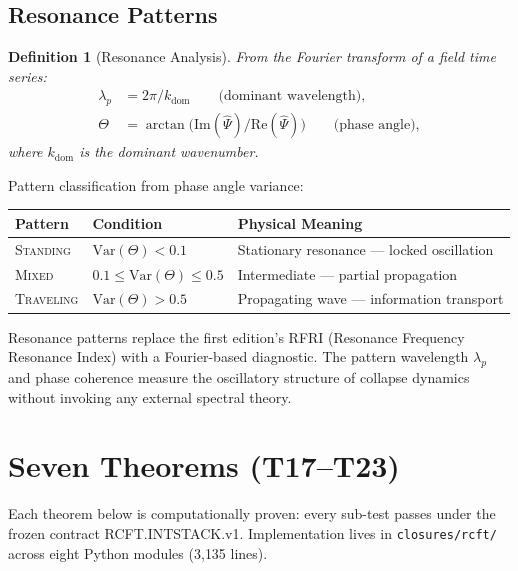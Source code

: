 \documentclass[
  aps,
  prd,
  preprint,
  superscriptaddress,
  nofootinbib,
  floatfix,
  longbibliography
]{revtex4-2}
\newtheorem{definition}[theorem]{Definition}
\newcommand{\regime}[1]{\textnormal{\textsc{#1}}}
\newcommand{\Psifield}{\Psi}
\begin{document}
\subsection{Resonance Patterns}

\begin{definition}[Resonance Analysis]\label{def:resonance}
From the Fourier transform of a field time series:
\begin{align}
  \lambda_p &= 2\pi / k_{\mathrm{dom}}
    \qquad\text{(dominant wavelength)}, \nonumber\\
  \Theta &= \arctan\!\bigl(
    \mathrm{Im}(\hat{\Psifield}) /
    \mathrm{Re}(\hat{\Psifield})\bigr)
    \qquad\text{(phase angle)},
\end{align}
where $k_{\mathrm{dom}}$ is the dominant wavenumber.
\end{definition}

Pattern classification from phase angle variance:

\begin{center}
\begin{tabular}{@{}lll@{}}
\toprule
\textbf{Pattern} & \textbf{Condition} &
  \textbf{Physical Meaning} \\
\midrule
\regime{Standing}  & $\mathrm{Var}(\Theta) < 0.1$ &
  Stationary resonance — locked oscillation \\
\regime{Mixed}     & $0.1 \leq \mathrm{Var}(\Theta) \leq 0.5$ &
  Intermediate — partial propagation \\
\regime{Traveling} & $\mathrm{Var}(\Theta) > 0.5$ &
  Propagating wave — information transport \\
\bottomrule
\end{tabular}
\end{center}

Resonance patterns replace the first edition's RFRI
(Resonance Frequency Resonance Index) with a Fourier-based
diagnostic.
The pattern wavelength $\lambda_p$ and phase coherence
measure the oscillatory structure of collapse dynamics
without invoking any external spectral theory.

\section{Seven Theorems (T17–T23)}\label{sec:theorems}

Each theorem below is computationally proven: every sub-test
passes under the frozen contract RCFT.INTSTACK.v1.
Implementation lives in \texttt{closures/rcft/} across
eight Python modules (3{,}135 lines).
\end{document}
